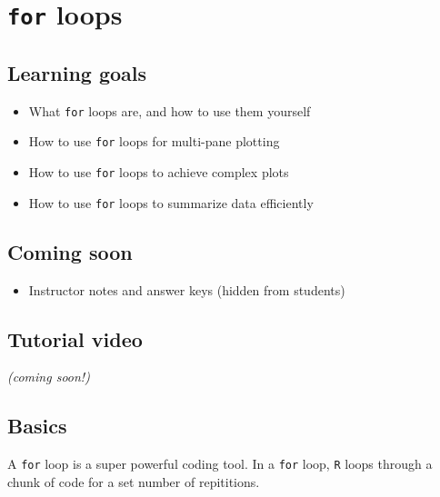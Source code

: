 \documentclass[
]{book}
\providecommand{\tightlist}{%
  \setlength{\itemsep}{0pt}\setlength{\parskip}{0pt}}
\begin{document}
\hypertarget{for-loops}{%
\chapter{\texorpdfstring{\texttt{for} loops}{for loops}}\label{for-loops}}

\hypertarget{learning-goals-7}{%
\section*{Learning goals}\label{learning-goals-7}}

\begin{itemize}
\tightlist
\item
  What \texttt{for} loops are, and how to use them yourself
\item
  How to use \texttt{for} loops for multi-pane plotting\\
\item
  How to use \texttt{for} loops to achieve complex plots\\
\item
  How to use \texttt{for} loops to summarize data efficiently
\end{itemize}

\hypertarget{coming-soon}{%
\section*{Coming soon}\label{coming-soon}}

\begin{itemize}
\tightlist
\item
  Instructor notes and answer keys (hidden from students)
\end{itemize}

\hypertarget{tutorial-video-1}{%
\section*{Tutorial video}\label{tutorial-video-1}}

\emph{(coming soon!)}

\hypertarget{basics}{%
\section*{Basics}\label{basics}}

A \texttt{for} loop is a super powerful coding tool. In a \texttt{for} loop, \texttt{R} loops through a chunk of code for a set number of repititions.
\end{document}
